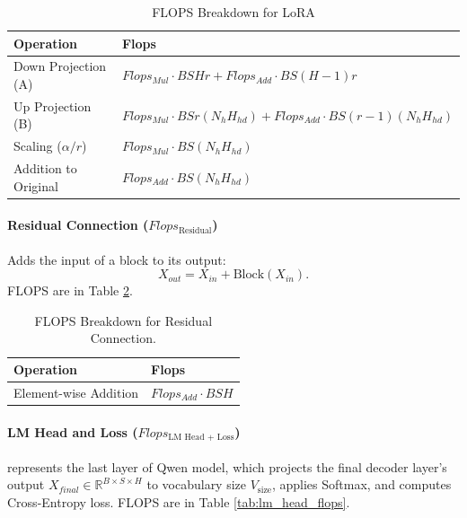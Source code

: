 \documentclass{article}
\begin{document}
\begin{table}[!thbp]
\renewcommand{\arraystretch}{1.4} \centering \setlength{\tabcolsep}{8pt}
\begin{tabular}{@{}ll@{}} %
    \toprule \textbf{Operation} & \textbf{Flops} \\ \midrule
    Down Projection (A) & $Flops_{Mul} \cdot BSH r + Flops_{Add} \cdot BS(H - 1) r$ \\ %
    Up Projection (B) & $Flops_{Mul} \cdot BS r (N_{h} H_{hd}) + Flops_{Add} \cdot BS(r - 1) (N_{h} H_{hd})$ \\ %
    Scaling ($\alpha/r$) & $Flops_{Mul} \cdot BS (N_{h} H_{hd})$ \\
    Addition to Original & $Flops_{Add} \cdot BS (N_{h} H_{hd})$ \\
    \bottomrule
\end{tabular}
\caption{FLOPS Breakdown for LoRA} \label{tab:lora_flops}
\end{table}

\paragraph{Residual Connection ($Flops_{\text{Residual}}$)}
Adds the input of a block to its output: 
$$X_{out} = X_{in} + \text{Block}(X_{in}).$$ FLOPS are in Table \ref{tab:residual_flops}.

\begin{table}[!thbp]
\renewcommand{\arraystretch}{1.4} \centering \setlength{\tabcolsep}{8pt}
\begin{tabular}{@{}ll@{}} %
    \toprule \textbf{Operation} & \textbf{Flops} \\ \midrule
    Element-wise Addition & $Flops_{Add} \cdot BSH$ \\
    \bottomrule
\end{tabular}
\caption{FLOPS Breakdown for Residual Connection.} \label{tab:residual_flops}
\end{table}

\paragraph{LM Head and Loss ($Flops_{\text{LM Head + Loss}}$)} represents the last layer of Qwen model, which
projects the final decoder layer's output $X_{final} \in \mathbb{R}^{B \times S \times H}$ to vocabulary size $V_{\text{size}}$, applies Softmax, and computes Cross-Entropy loss. FLOPS are in Table \ref{tab:lm_head_flops}.
\end{document}
